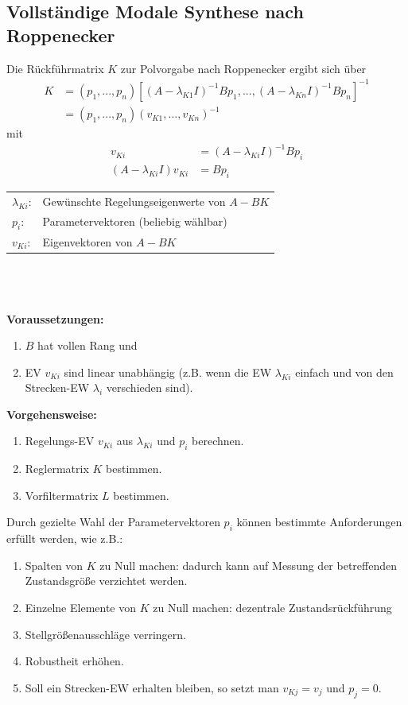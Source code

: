 \documentclass[a4paper,twocolumn,10pt]{article}
\begin{document}
\subsection{Vollständige Modale Synthese nach Roppenecker}
Die Rückführmatrix $K$ zur Polvorgabe nach Roppenecker ergibt sich über
\begin{align*}
K&=(p_1,...,p_n)\left[(A-\lambda_{K1}I)^{-1}Bp_1,...,(A-\lambda_{Kn}I)^{-1}Bp_n\right]^{-1}\\
&=(p_1,...,p_n)(v_{K1},...,v_{Kn})^{-1}
\end{align*}
mit
\begin{align*}
v_{Ki}&=(A-\lambda_{Ki}I)^{-1}Bp_i\\
(A-\lambda_{Ki}I)v_{Ki}&=Bp_i
\end{align*}
\begin{tabular}{ll}
$\lambda_{Ki}$: & Gewünschte Regelungseigenwerte von $A-BK$\\
$p_i$: & Parametervektoren (beliebig wählbar)\\
$v_{Ki}$: & Eigenvektoren von $A-BK$
\end{tabular}\\\\\\
\textbf{Voraussetzungen:}
\begin{enumerate}[label=$\bullet$]
\item $B$ hat vollen Rang und
\item EV $v_{Ki}$ sind linear unabhängig (z.B. wenn die EW $\lambda_{Ki}$ einfach und von den Strecken-EW $\lambda_i$ verschieden sind).
\end{enumerate}
\textbf{Vorgehensweise:}
\begin{enumerate}
\item Regelungs-EV $v_{Ki}$ aus $\lambda_{Ki}$ und $p_i$ berechnen.
\item Reglermatrix $K$ bestimmen.
\item Vorfiltermatrix $L$ bestimmen.
\end{enumerate}
Durch gezielte Wahl der Parametervektoren $p_i$ können bestimmte Anforderungen erfüllt werden, wie z.B.:
\begin{enumerate}[label=$\bullet$]
\item Spalten von $K$ zu Null machen: dadurch kann auf Messung der betreffenden Zustandsgröße verzichtet werden.
\item Einzelne Elemente von $K$ zu Null machen: dezentrale Zustandsrückführung
\item Stellgrößenausschläge verringern.
\item Robustheit erhöhen.
\item Soll ein Strecken-EW erhalten bleiben, so setzt man $v_{Kj}=v_j$ und $p_j=0$.
\end{enumerate}
\end{document}
